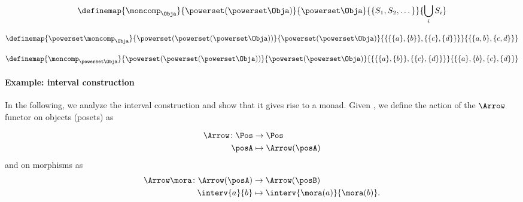 \begin{equation}
    \label{eq:monad-power-moncomp}
    \definemap{
        \moncomp_{\Obja}
    }{
        \powerset (\powerset\Obja)
    }{
        \powerset \Obja
    }{
        \{S_1, S_2, \dots \}
    }{
        \bigcup_i S_i
    }
\end{equation}


\begin{equation}
    \label{eq:monad-power-power-moncomp}
    \definemap{
        \powerset \moncomp_{\Obja}
    }{
        \powerset (\powerset (\powerset\Obja))
    }{
        \powerset (\powerset \Obja)
    }{
        \{  \{   \{a\}, \{b\} \} , \{ \{c\}, \{d\} \}\}
    }{
        \{  \{ a, b \}, \{ c, d \} \}
    }
\end{equation}


\begin{equation}
    \label{eq:monad-power-moncomp-power}
    \definemap{
        \moncomp_{\powerset \Obja}
    }{
        \powerset (\powerset (\powerset\Obja))
    }{
        \powerset (\powerset \Obja)
    }{
        \{  \{   \{a\}, \{b\} \} , \{ \{c\}, \{d\} \}\}
    }{
        \{    \{a\}, \{b\}  ,  \{c\}, \{d\}  \}
    }
\end{equation}


\paragraph*{Example: interval construction}
In the following, we analyze the interval construction and show that it gives rise to a monad.
Given \Pos, we define the action of the $\Arrow$ functor on objects (posets) as

\begin{equation}
    \label{eq:monad-arrow-functor-objects}
    \begin{aligned}
        \Arrow\colon \Pos&\to \Pos\\
        \posA&\mapsto \Arrow(\posA)
    \end{aligned}
\end{equation}
and on morphisms as
\begin{equation}
    \label{eq:monad-arrow-functor-morphisms}
    \begin{aligned}
        \Arrow \mora\colon \Arrow(\posA)&\to \Arrow(\posB)\\
        \interv{a}{b}&\mapsto \interv{\mora(a)}{\mora(b)}.
    \end{aligned}
\end{equation}

